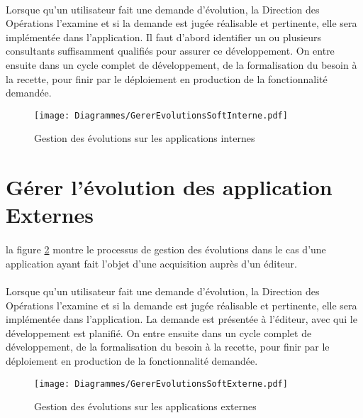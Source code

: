 \paragraph{} Lorsque qu'un utilisateur fait une demande d'évolution, la Direction des Opérations l'examine et si la demande est jugée réalisable et pertinente, elle sera implémentée dans l'application. Il faut d'abord identifier un ou plusieurs consultants suffisamment qualifiés pour assurer ce développement. On entre ensuite dans un cycle complet de développement, de la formalisation du besoin à la recette, pour finir par le déploiement en production de la fonctionnalité demandée.
\begin{figure}
	\centering
	\begin{sideways}
	\texttt{[image: Diagrammes/GererEvolutionsSoftInterne.pdf]}
	\end{sideways}
	\caption{Gestion des évolutions sur les applications internes}
	\label{evolutionsSoftInternes}
\end{figure}




\section{Gérer l'évolution des application Externes}

\paragraph{} la figure \ref{evolutionsSoftExternes} montre le processus de gestion des évolutions dans le cas d'une application ayant fait l'objet d'une acquisition auprès d'un éditeur.

\paragraph{} Lorsque qu'un utilisateur fait une demande d'évolution, la Direction des Opérations l'examine et si la demande est jugée réalisable et pertinente, elle sera implémentée dans l'application. La demande est présentée à l'éditeur, avec qui le développement est planifié. On entre ensuite dans un cycle complet de développement, de la formalisation du besoin à la recette, pour finir par le déploiement en production de la fonctionnalité demandée.

\begin{figure}
	\centering
	\begin{sideways}
	\texttt{[image: Diagrammes/GererEvolutionsSoftExterne.pdf]}
	\end{sideways}
	\caption{Gestion des évolutions sur les applications externes}
	\label{evolutionsSoftExternes}
\end{figure}



